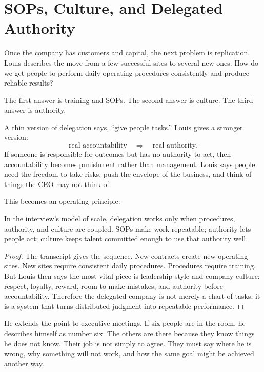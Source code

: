 \section{SOPs, Culture, and Delegated Authority}

Once the company has customers and capital, the next problem is replication. Louis describes the move from a few successful sites to several new ones. How do we get people to perform daily operating procedures consistently and produce reliable results?

The first answer is training and SOPs. The second answer is culture. The third answer is authority.

A thin version of delegation says, ``give people tasks.'' Louis gives a stronger version:
\begin{equation}
\text{real accountability}
\quad\Rightarrow\quad
\text{real authority}.
\end{equation}
If someone is responsible for outcomes but has no authority to act, then accountability becomes punishment rather than management. Louis says people need the freedom to take risks, push the envelope of the business, and think of things the CEO may not think of.

This becomes an operating principle:
\begin{proposition}
In the interview's model of scale, delegation works only when procedures, authority, and culture are coupled. SOPs make work repeatable; authority lets people act; culture keeps talent committed enough to use that authority well.
\end{proposition}

\begin{proof}
The transcript gives the sequence. New contracts create new operating sites. New sites require consistent daily procedures. Procedures require training. But Louis then says the most vital piece is leadership style and company culture: respect, loyalty, reward, room to make mistakes, and authority before accountability. Therefore the delegated company is not merely a chart of tasks; it is a system that turns distributed judgment into repeatable performance.
\end{proof}

He extends the point to executive meetings. If six people are in the room, he describes himself as number six. The others are there because they know things he does not know. Their job is not simply to agree. They must say where he is wrong, why something will not work, and how the same goal might be achieved another way.

